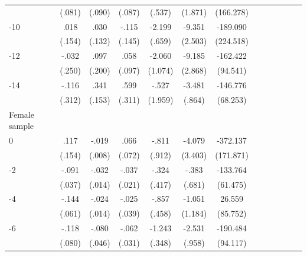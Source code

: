 \begin{table}[p]
\begin{adjustbox}{max width=\linewidth}
\begin{threeparttable}
{\begin{tabular}{l*{6}{SS}}
                &   (.081)         &   (.090)         &   (.087)         &   (.537)         &  (1.871)         &(166.278)         \\
-10            &     .018         &     .030         &    -.115         &   -2.199\sym{***}&   -9.351\sym{***}& -189.090         \\
                &   (.154)         &   (.132)         &   (.145)         &   (.659)         &  (2.503)         &(224.518)         \\
-12           &    -.032         &     .097         &     .058         &   -2.060         &   -9.185\sym{**} & -162.422         \\
                &   (.250)         &   (.200)         &   (.097)         &  (1.074)         &  (2.868)         & (94.541)         \\
-14           &    -.116         &     .341\sym{*}  &     .599         &    -.527         &   -3.481\sym{***}& -146.776\sym{*}  \\
                &   (.312)         &   (.153)         &   (.311)         &  (1.959)         &   (.864)         & (68.253)         \\
\midrule
Female sample &&&&&&\\
0               &     .117         &    -.019\sym{*}  &     .066         &    -.811         &   -4.079         & -372.137\sym{*}  \\
                &   (.154)         &   (.008)         &   (.072)         &   (.912)         &  (3.403)         &(171.871)         \\
-2             &    -.091\sym{*}  &    -.032\sym{*}  &    -.037         &    -.324         &    -.383         & -133.764\sym{*}  \\
                &   (.037)         &   (.014)         &   (.021)         &   (.417)         &   (.681)         & (61.475)         \\
-4             &    -.144\sym{*}  &    -.024         &    -.025         &    -.857         &   -1.051         &   26.559         \\
                &   (.061)         &   (.014)         &   (.039)         &   (.458)         &  (1.184)         & (85.752)         \\
-6             &    -.118         &    -.080         &    -.062\sym{*}  &   -1.243\sym{***}&   -2.531\sym{**} & -190.484\sym{*}  \\
                &   (.080)         &   (.046)         &   (.031)         &   (.348)         &   (.958)         & (94.117)         \\

\end{tabular}}
\end{threeparttable}
\end{adjustbox}
\end{table}

